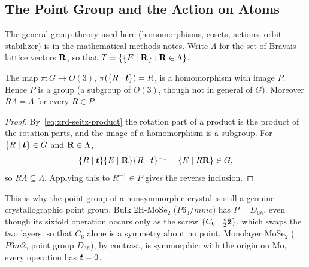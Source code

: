 \subsection{The Point Group and the Action on Atoms}
\label{sec:xrd-site-symmetry}

The general group theory used here (homomorphisms, cosets, actions, orbit--stabilizer) is in the mathematical-methods notes. Write $\Lambda$ for the set of Bravais-lattice vectors $\cvect{R}$, so that $T = \{\{E\mid\cvect{R}\}:\cvect{R}\in\Lambda\}$.

\begin{theorem}
The map $\pi:G\to O(3)$, $\pi(\{R\mid\bm{t}\}) = R$, is a homomorphism with image $P$. Hence $P$ is a group (a subgroup of $O(3)$, though not in general of $G$). Moreover $R\Lambda = \Lambda$ for every $R\in P$.
\end{theorem}
\begin{proof}
By~\eqref{eq:xrd-seitz-product} the rotation part of a product is the product of the rotation parts, and the image of a homomorphism is a subgroup. For $\{R\mid\bm{t}\}\in G$ and $\cvect{R}\in\Lambda$,
\[
    \{R\mid\lvect{t}\}\{E\mid\cvect{R}\}\{R\mid\lvect{t}\}^{-1} = \{E\mid R\cvect{R}\}\in G,
\]
so $R\Lambda\subseteq\Lambda$. Applying this to $R^{-1}\in P$ gives the reverse inclusion.
\end{proof}

This is why the point group of a nonsymmorphic crystal is still a genuine crystallographic point group. Bulk 2H-MoSe$_2$ ($P6_3/mmc$) has $P = D_{6h}$, even though its sixfold operation occurs only as the screw $\{C_6\mid\tfrac{c}{2}\boldsymbol{\hat{\textbf{z}}}\}$, which swaps the two layers, so that $C_6$ alone is a symmetry about no point. Monolayer MoSe$_2$ ($P\bar{6}m2$, point group $D_{3h}$), by contrast, is symmorphic: with the origin on Mo, every operation has $\bm{t} = 0$.

